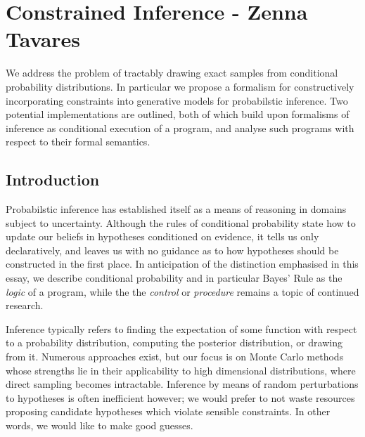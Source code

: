
\chapter{Constrained Inference - Zenna Tavares} %

We address the problem of tractably drawing exact samples from conditional probability distributions.
In particular we propose a formalism for constructively incorporating constraints into generative models for probabilstic inference.
Two potential implementations are outlined, both of which build upon formalisms of inference as conditional execution of a program, and analyse such programs with respect to their formal semantics.

\section{Introduction}
\label{ch:examples} %


Probabilstic inference has established itself as a means of reasoning in domains subject to uncertainty.
Although the rules of conditional probability state how to update our beliefs in hypotheses conditioned on evidence, it tells us only declaratively, and leaves us with no guidance as to how hypotheses should be constructed in the first place.
In anticipation of the distinction emphasised in this essay, we describe conditional probability and in particular Bayes' Rule as the \textit{logic} of a program, while the the \textit{control} or \textit{procedure} remains a topic of continued research.

Inference typically refers to finding the expectation of some function with respect to a probability distribution, computing the posterior distribution, or drawing from it.
Numerous approaches exist, but our focus is on Monte Carlo methods whose strengths lie in their applicability to high dimensional distributions, where direct sampling becomes intractable.
Inference by means of random perturbations to hypotheses is often inefficient however; we would prefer to not waste resources proposing candidate hypotheses which violate sensible constraints.
In other words, we would like to make good guesses.

